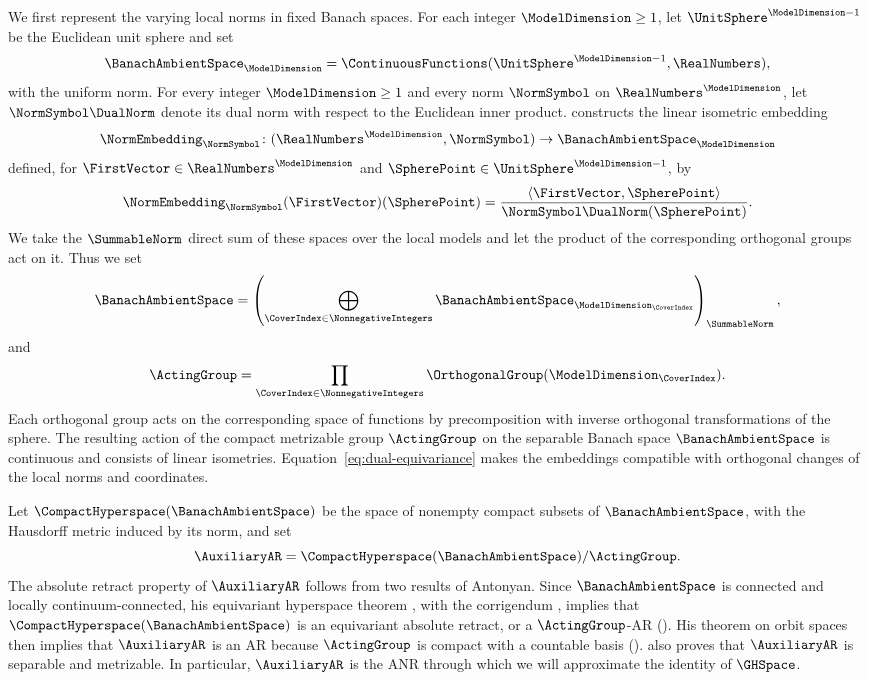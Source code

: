 We first represent the varying local norms in fixed Banach spaces.
For each integer
$\ModelDimension\geq1$,
let
$\UnitSphere^{\ModelDimension-1}$
be the Euclidean unit sphere and set
\[
 \BanachAmbientSpace_\ModelDimension
 =\ContinuousFunctions(\UnitSphere^{\ModelDimension-1},\RealNumbers),
\]
with the uniform norm.
For every integer
$\ModelDimension\geq1$
and every norm
$\NormSymbol$
on
$\RealNumbers^\ModelDimension$,
let
$\NormSymbol\DualNorm$
denote its dual norm with respect to the Euclidean inner product.
 constructs the linear isometric embedding
\[
 \NormEmbedding_\NormSymbol\colon
 (\RealNumbers^\ModelDimension,\NormSymbol)
 \to\BanachAmbientSpace_\ModelDimension
\]
defined,
for
$\FirstVector\in\RealNumbers^\ModelDimension$
and
$\SpherePoint\in\UnitSphere^{\ModelDimension-1}$,
by
\[
 \NormEmbedding_\NormSymbol(\FirstVector)(\SpherePoint)
 =\frac{\langle\FirstVector,\SpherePoint\rangle}
       {\NormSymbol\DualNorm(\SpherePoint)}.
\]
We take the
$\SummableNorm$
direct sum of these spaces over the local models and let the product
of the corresponding orthogonal groups act on it.
Thus we set
\[
 \BanachAmbientSpace
 =\left(\bigoplus_{\CoverIndex\in\NonnegativeIntegers}
        \BanachAmbientSpace_{\ModelDimension_\CoverIndex}\right)_{\SummableNorm},
\]
and
\[
 \ActingGroup
 =\prod_{\CoverIndex\in\NonnegativeIntegers}
   \OrthogonalGroup(\ModelDimension_\CoverIndex).
\]
Each orthogonal group acts on the corresponding space of functions
by precomposition with inverse orthogonal transformations of the sphere.
The resulting action of the compact metrizable group
$\ActingGroup$
on the separable Banach space
$\BanachAmbientSpace$
is continuous and consists of linear isometries.
Equation~\eqref{eq:dual-equivariance} makes the embeddings compatible
with orthogonal changes of the local norms and coordinates.

Let
$\CompactHyperspace(\BanachAmbientSpace)$
be the space of nonempty compact subsets of
$\BanachAmbientSpace$,
with the Hausdorff metric induced by its norm,
and set
\[
 \AuxiliaryAR=\CompactHyperspace(\BanachAmbientSpace)/\ActingGroup.
\]
The absolute retract property of
$\AuxiliaryAR$
follows from two results of Antonyan.
Since
$\BanachAmbientSpace$
is connected and locally continuum-connected,
his equivariant hyperspace theorem
\cite[Proposition~3.1]{Antonyan2003West},
with the corrigendum \cite{Antonyan2006Correction},
implies that
$\CompactHyperspace(\BanachAmbientSpace)$
is an equivariant absolute retract,
or a
$\ActingGroup$-AR
().
His theorem on orbit spaces
\cite[Theorem~8 and Corollary~1]{Antonyan1990}
then implies that
$\AuxiliaryAR$
is an AR because
$\ActingGroup$
is compact with a countable basis
().
 also proves that
$\AuxiliaryAR$
is separable and metrizable.
In particular,
$\AuxiliaryAR$
is the ANR through which we will approximate the identity of
$\GHSpace$.

